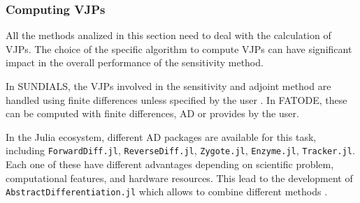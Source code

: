 \subsubsection{Computing VJPs}

All the methods analized in this section need to deal with the calculation of VJPs.  
The choice of the specific algorithm to compute VJPs can have significant impact in the overall performance of the sensitivity method. 

In SUNDIALS, the VJPs involved in the sensitivity and adjoint method are handled using finite differences unless specified by the user \cite{SUNDIALS-hindmarsh2005sundials}.
In FATODE, these can be computed with finite differences, AD or provides by the user.

In the Julia ecosystem, different AD packages are available for this task, including \texttt{ForwardDiff.jl}, \texttt{ReverseDiff.jl}, \texttt{Zygote.jl}\cite{Innes_Zygote}, \texttt{Enzyme.jl}\cite{moses_Enzyme}, \texttt{Tracker.jl}.
Each one of these have different advantages depending on scientific problem, computational features, and hardware resources.
This lead to the development of \texttt{AbstractDifferentiation.jl} which allows to combine different methods \cite{Schäfer_Tarek_White_Rackauckas_2021}. 